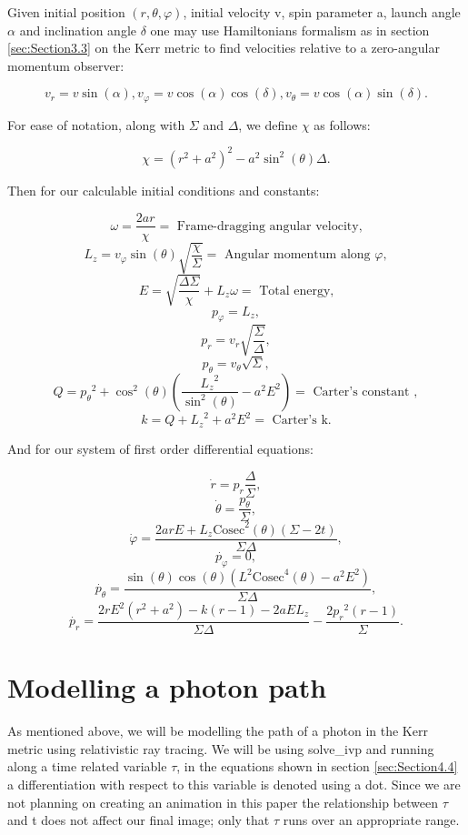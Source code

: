 \documentclass[oneside,openright,frontopenright, singlespacing]{dmathesis}
\begin{document}
\vspace{1em}
	Given initial position $(r, \theta, \varphi)$, initial velocity v, spin parameter a, launch angle $\alpha$ and inclination angle $\delta$ one may use Hamiltonians formalism as in section \ref{sec:Section3.3} on the Kerr metric to find velocities relative to a zero-angular momentum observer:
	
	\[v_r = v\sin(\alpha), v_\varphi = v\cos(\alpha)\cos(\delta), v_\theta = v\cos(\alpha)\sin(\delta).\]

\vspace{1em}
	For ease of notation, along with $\Sigma$ and $\Delta$, we define $\chi$ as follows:

	\[\chi = (r^2+a^2)^2-a^2\sin^2(\theta)\Delta.\]

\vspace{1em}
	Then for our calculable initial conditions and constants:

	\[\omega = \frac{2ar}{\chi} = \mbox{ Frame-dragging angular velocity,}\]
	\[L_{z} = v_{\varphi}\sin(\theta)\sqrt{\frac{\chi}{\Sigma}} = \mbox{ Angular momentum along } \varphi,\]
	\[E = \sqrt{\frac{\Delta\Sigma}{\chi}}+L_{z}\omega = \mbox{ Total energy,}\]
	\[p_{\varphi} = L_{z},\]
	\[p_{r} = v_{r}\sqrt{\frac{\Sigma}{\Delta}},\]
	\[p_{\theta} = v_{\theta}\sqrt{\Sigma},\]
	\[Q = {p_{\theta}}^2+\cos^2(\theta)\left(\frac{{L_{z}}^2}{\sin^2(\theta)}-a^2E^2\right) = \mbox{ Carter's constant },\]
	\[k = Q+{L_{z}}^2+a^2E^2 = \mbox{ Carter's k.}\]

\vspace{1em}
	And for our system of first order differential equations:

	\[\dot{r} = p_r\frac{\Delta}{\Sigma},\]
	\[\dot{\theta} = \frac{p_\theta}{\Sigma},\]
	\[\dot{\varphi} = \frac{2arE+L_{z}\mbox{Cosec}^2(\theta)(\Sigma-2t)}{\Sigma\Delta},\]
	\[\dot{p_{\varphi}} = 0,\]
	\[\dot{p_{\theta}} = \frac{\sin(\theta)\cos(\theta)(L^2\mbox{Cosec}^4(\theta)-a^2E^2)}{\Sigma\Delta},\]
	\[\dot{p_{r}} = \frac{2rE^2(r^2+a^2)-k(r-1)-2aEL_{z}}{\Sigma\Delta}-\frac{2{p_{r}}^2(r-1)}{\Sigma}.\]

\section{Modelling a photon path}\label{sec:Section4.6}

	As mentioned above, we will be modelling the path of a photon in the Kerr metric using relativistic ray tracing. We will be using solve\_ivp and running along a time related variable $\tau$, in the equations shown in section \ref{sec:Section4.4} a differentiation with respect to this variable is denoted using a dot. Since we are not planning on creating an animation in this paper the relationship between $\tau$ and t does not affect our final image; only that $\tau$ runs over an appropriate range.
\end{document}
